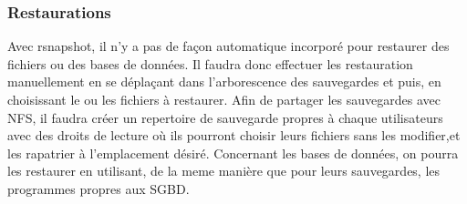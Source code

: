 \documentclass[a4paper]{report}
\begin{document}
		\subsubsection{Restaurations}
			Avec rsnapshot, il n'y a pas de façon automatique incorporé pour restaurer des fichiers ou des bases de données. Il faudra donc effectuer les restauration manuellement en se déplaçant dans l'arborescence des sauvegardes et puis, en choisissant le ou les fichiers à restaurer. Afin de partager les sauvegardes avec NFS, il faudra créer un repertoire de sauvegarde propres à chaque utilisateurs avec des droits de lecture où ils pourront choisir leurs fichiers sans les modifier,et les rapatrier à l'emplacement désiré. Concernant les bases de données, on pourra les restaurer en utilisant, de la meme manière que pour leurs sauvegardes, les programmes propres aux SGBD.
\end{document}
